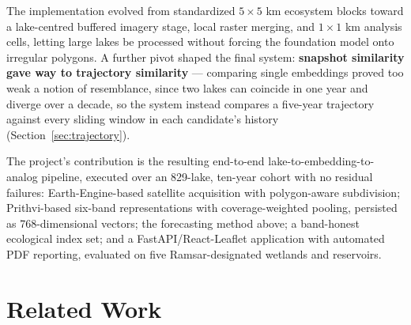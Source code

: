 \documentclass[12pt,a4paper,oneside]{report}
\begin{document}
The implementation evolved from standardized $5\times5$ km ecosystem
blocks toward a lake-centred buffered imagery stage, local raster
merging, and $1\times1$ km analysis cells, letting large lakes be
processed without forcing the foundation model onto irregular
polygons. A further pivot shaped the final system:
\textbf{snapshot similarity gave way to trajectory similarity} ---
comparing single embeddings proved too weak a notion of resemblance,
since two lakes can coincide in one year and diverge over a decade,
so the system instead compares a five-year trajectory against every
sliding window in each candidate's history
(Section~\ref{sec:trajectory}).

The project's contribution is the resulting end-to-end
lake-to-embedding-to-analog pipeline, executed over an 829-lake,
ten-year cohort with no residual failures: Earth-Engine-based
satellite acquisition with polygon-aware subdivision; Prithvi-based
six-band representations with coverage-weighted pooling, persisted
as 768-dimensional vectors; the forecasting method above; a
band-honest ecological index set; and a FastAPI/React-Leaflet
application with automated PDF reporting, evaluated on five
Ramsar-designated wetlands and reservoirs.

\section{Related Work}
\label{sec:related_work}
\end{document}

